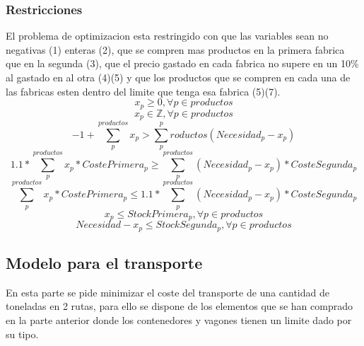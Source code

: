 \documentclass[11pt,spanish]{article}
\begin{document}
			\subsubsection{Restricciones}
			El problema de optimizacion esta restringido con que las variables sean no negativas (1) enteras (2), que se compren mas productos en la primera fabrica que en la segunda (3), que el precio gastado en cada fabrica no supere en un 10\% al gastado en al otra (4)(5) y que los productos que se compren en cada una de las fabricas esten dentro del limite que tenga esa fabrica (5)(7).
			\begin{equation}
			x_p \geq 0, \forall p \in productos
			\end{equation}
			\begin{equation}
			x_p \in \mathbb{Z} , \forall p \in productos
			\end{equation}
			\begin{equation}
			-1 + \sum_p^{productos} x_p > \sum_p^productos (Necesidad_p - x_p)
			\end{equation}
			\begin{equation}
			1.1*\sum_p^{productos} x_p*CostePrimera_p \geq \sum_p^{productos} (Necesidad_p - x_p)*CosteSegunda_p
			\end{equation}
			\begin{equation}
			\sum_p^{productos} x_p*CostePrimera_p \leq 1.1*\sum_p^{productos} (Necesidad_p - x_p)*CosteSegunda_p
			\end{equation}
			\begin{equation}
			x_p \leq StockPrimera_p, \forall p \in productos
			\end{equation}
			\begin{equation}
			Necesidad - x_p \leq StockSegunda_p, \forall p \in productos
			\end{equation}
		\subsection{Modelo para el transporte}
		En esta parte se pide minimizar el coste del transporte de una cantidad de toneladas en 2 rutas, para ello se dispone de los elementos que se han comprado en la parte anterior donde los contenedores y vagones tienen un limite dado por su tipo.
\end{document}
